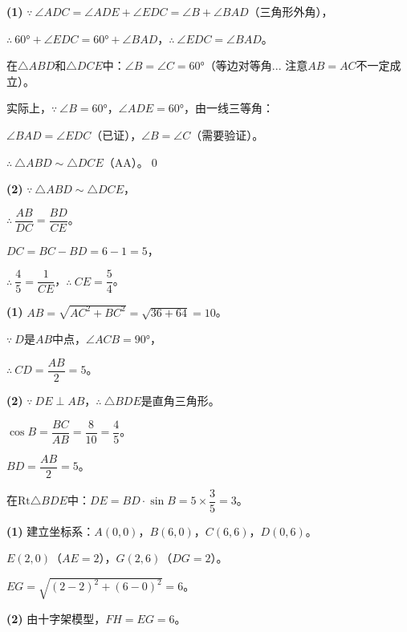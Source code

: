 \documentclass[12pt, a4paper]{ctexart}
\begin{document}
\begin{proofbox}[【题3】详解]
\textbf{(1)} $\because\ \angle ADC = \angle ADE + \angle EDC = \angle B + \angle BAD$（三角形外角），

$\therefore\ 60° + \angle EDC = 60° + \angle BAD$，$\therefore\ \angle EDC = \angle BAD$。

在$\triangle ABD$和$\triangle DCE$中：$\angle B = \angle C = 60°$（等边对等角... 注意$AB = AC$不一定成立）。

实际上，$\because\ \angle B = 60°$，$\angle ADE = 60°$，由一线三等角：

$\angle BAD = \angle EDC$（已证），$\angle B = \angle C$（需要验证）。

$\therefore\ \triangle ABD \sim \triangle DCE$（AA）。\qed

\textbf{(2)} $\because\ \triangle ABD \sim \triangle DCE$，

$\therefore\ \dfrac{AB}{DC} = \dfrac{BD}{CE}$。

$DC = BC - BD = 6 - 1 = 5$，

$\therefore\ \dfrac{4}{5} = \dfrac{1}{CE}$，$\therefore\ CE = \boxed{\dfrac{5}{4}}$。
\end{proofbox}

\begin{proofbox}[【题4】详解]
\textbf{(1)} $AB = \sqrt{AC^2 + BC^2} = \sqrt{36 + 64} = 10$。

$\because\ D$是$AB$中点，$\angle ACB = 90°$，

$\therefore\ CD = \dfrac{AB}{2} = \boxed{5}$。

\textbf{(2)} $\because\ DE \perp AB$，$\therefore\ \triangle BDE$是直角三角形。

$\cos B = \dfrac{BC}{AB} = \dfrac{8}{10} = \dfrac{4}{5}$。

$BD = \dfrac{AB}{2} = 5$。

在$\mathrm{Rt}\triangle BDE$中：$DE = BD \cdot \sin B = 5 \times \dfrac{3}{5} = \boxed{3}$。
\end{proofbox}

\begin{proofbox}[【题5】详解]
\textbf{(1)} 建立坐标系：$A(0,0)$，$B(6,0)$，$C(6,6)$，$D(0,6)$。

$E(2,0)$（$AE=2$），$G(2,6)$（$DG=2$）。

$EG = \sqrt{(2-2)^2 + (6-0)^2} = \boxed{6}$。

\textbf{(2)} 由十字架模型，$FH = EG = \boxed{6}$。
\end{proofbox}
\end{document}
